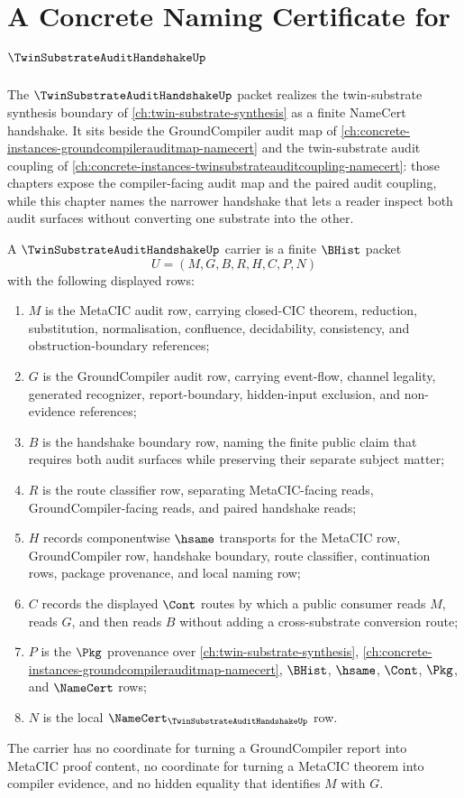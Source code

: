 \chapter{A Concrete Naming Certificate for $\TwinSubstrateAuditHandshakeUp$}
\label{ch:concrete-instances-twin-substrate-audit-handshake-namecert}

The $\TwinSubstrateAuditHandshakeUp$ packet realizes the twin-substrate synthesis boundary of \autoref{ch:twin-substrate-synthesis} as a finite NameCert handshake. It sits beside the GroundCompiler audit map of \autoref{ch:concrete-instances-groundcompilerauditmap-namecert} and the twin-substrate audit coupling of \autoref{ch:concrete-instances-twinsubstrateauditcoupling-namecert}: those chapters expose the compiler-facing audit map and the paired audit coupling, while this chapter names the narrower handshake that lets a reader inspect both audit surfaces without converting one substrate into the other.

\begin{definition}
\label{def:twin-substrate-audit-handshake-carrier}
A $\TwinSubstrateAuditHandshakeUp$ carrier is a finite $\BHist$ packet
$$
U=(M,G,B,R,H,C,P,N)
$$
with the following displayed rows:
\begin{enumerate}
\item $M$ is the MetaCIC audit row, carrying closed-CIC theorem, reduction, substitution, normalisation, confluence, decidability, consistency, and obstruction-boundary references;
\item $G$ is the GroundCompiler audit row, carrying event-flow, channel legality, generated recognizer, report-boundary, hidden-input exclusion, and non-evidence references;
\item $B$ is the handshake boundary row, naming the finite public claim that requires both audit surfaces while preserving their separate subject matter;
\item $R$ is the route classifier row, separating MetaCIC-facing reads, GroundCompiler-facing reads, and paired handshake reads;
\item $H$ records componentwise $\hsame$ transports for the MetaCIC row, GroundCompiler row, handshake boundary, route classifier, continuation rows, package provenance, and local naming row;
\item $C$ records the displayed $\Cont$ routes by which a public consumer reads $M$, reads $G$, and then reads $B$ without adding a cross-substrate conversion route;
\item $P$ is the $\Pkg$ provenance over \autoref{ch:twin-substrate-synthesis}, \autoref{ch:concrete-instances-groundcompilerauditmap-namecert}, $\BHist$, $\hsame$, $\Cont$, $\Pkg$, and $\NameCert$ rows;
\item $N$ is the local $\NameCert_{\TwinSubstrateAuditHandshakeUp}$ row.
\end{enumerate}
The carrier has no coordinate for turning a GroundCompiler report into MetaCIC proof content, no coordinate for turning a MetaCIC theorem into compiler evidence, and no hidden equality that identifies $M$ with $G$.
\end{definition}

